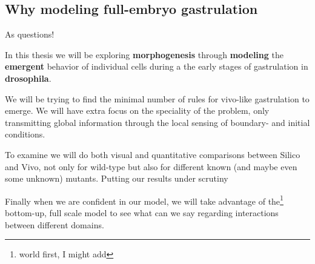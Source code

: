 \subsection{Why modeling full-embryo gastrulation }
As questions!








In this thesis we will be exploring \textbf{morphogenesis} through \textbf{modeling} the \textbf{emergent} behavior of individual cells during a the early stages of  gastrulation in \textbf{drosophila}.

We will be trying to find the minimal number of rules for vivo-like gastrulation to emerge. We will have extra focus on the speciality of the problem, only transmitting global information through the local sensing of boundary- and initial conditions.

To examine we will do both visual and quantitative comparisons between Silico and Vivo, not only for wild-type but also for different known (and maybe even some unknown) mutants. Putting our results under scrutiny 

Finally when we are confident in our model, we will take advantage of the\footnote{world first, I might add} bottom-up, full scale model to see what can we say regarding interactions between different domains.\\







